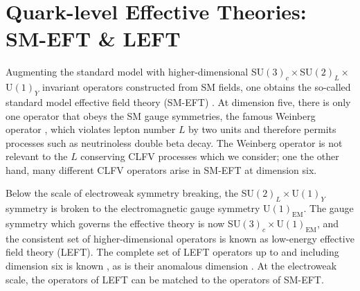 \documentclass{book}[letterpaper,12pt]
\begin{document}

\section{Quark-level Effective Theories: SM-EFT \& LEFT}
Augmenting the standard model with higher-dimensional SU$(3)_c\times$SU$(2)_L\times$U$(1)_Y$ invariant operators constructed from SM fields, one obtains the so-called standard model effective field theory (SM-EFT) \cite{Brivio:2017vri}. At dimension five, there is only one operator that obeys the SM gauge symmetries, the famous Weinberg operator \cite{PhysRevLett.43.1566}, which violates lepton number $L$ by two units and therefore permits processes such as neutrinoless double beta decay. The Weinberg operator is not relevant to the $L$ conserving CLFV processes which we consider; one the other hand, many different CLFV operators arise in SM-EFT at dimension six.

Below the scale of electroweak symmetry breaking, the SU$(2)_L\times$U$(1)_Y$ symmetry is broken to the electromagnetic gauge symmetry U$(1)_\mathrm{EM}$. The gauge symmetry which governs the effective theory is now SU$(3)_c\times$U$(1)_\mathrm{EM}$, and the consistent set of higher-dimensional operators is known as low-energy effective field theory (LEFT). The complete set of LEFT operators up to and including dimension six is known \cite{Jenkins:2017jig}, as is their anomalous dimension \cite{Jenkins:2017dyc}. At the electroweak scale, the operators of LEFT can be matched to the operators of SM-EFT. 
\end{document}
